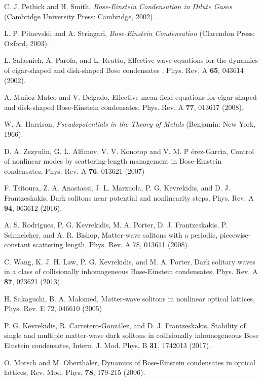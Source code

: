 \documentclass[aps,preprint,showkeys,
]{revtex4}
\begin{document}
\begin{thebibliography}{99}
 C. J. Pethick and H. Smith, \textit{Bose-Einstein Condensation
in Dilute Gases} (Cambridge University Press: Cambridge, 2002).

 L. P. Pitaevskii and A. Stringari, \textit{Bose-Einstein
Condensation} (Clarendon Press: Oxford, 2003).

 L. Salasnich, A. Parola, and L. Reatto, Effective wave
equations for the dynamics of cigar-shaped and disk-shaped Bose
condensates , Phys. Rev. A \textbf{65}, 043614 (2002).

 A. Mu\~{n}oz Mateo and V. Delgado, Effective mean-field
equations for cigar-shaped and disk-shaped Bose-Einstein
condensates, Phys. Rev. A \textbf{77}, 013617 (2008).

 W. A. Harrison, \textit{Pseudopotentials in the Theory of
Metals }(Benjamin: New York, 1966).

 D. A. Zezyulin, G. L. Alfimov, V. V. Konotop and V. M. P%
\'{e}rez-Garc\'{\i}a, Control of nonlinear modes by scattering-length
management in Bose-Einstein condensates, Phys. Rev. A \textbf{76}, 013621
(2007)

 F. Tsitoura, Z. A. Anastassi, J. L. Marzuola, P. G.
Kevrekidis, and D. J. Frantzeskakis, Dark solitons near potential and
nonlinearity steps, Phys. Rev. A \textbf{94}, 063612 (2016).

 A. S. Rodrigues, P. G. Kevrekidis, M. A. Porter, D. J.
Frantzeskakis, P. Schmelcher, and A. R. Bishop, Matter-wave solitons with a
periodic, piecewise-constant scattering length, Phys. Rev. A 78, 013611
(2008).

 C. Wang, K. J. H. Law, P. G. Kevrekidis, and M. A. Porter,
Dark solitary waves in a class of collisionally inhomogeneous Bose-Einstein
condensates, Phys. Rev. A \textbf{87}, 023621 (2013)

 H. Sakaguchi, B. A. Malomed, Matter-wave solitons in
nonlinear optical lattices, Phys. Rev. E 72, 046610 (2005)

 P. G. Kevrekidis, R. Carretero-Gonz\'{a}lez, and D. J.
Frantzeskakis, Stability of single and multiple matter-wave dark solitons in
collisionally inhomogeneous Bose Einstein condensates, Intern. J. Mod. Phys.
B \textbf{31}, 1742013 (2017).

 O. Morsch and M. Oberthaler, Dynamics of Bose-Einstein
condensates in optical lattices, Rev. Mod. Phys. \textbf{78}, 179-215 (2006).


\end{thebibliography}
\end{document}
